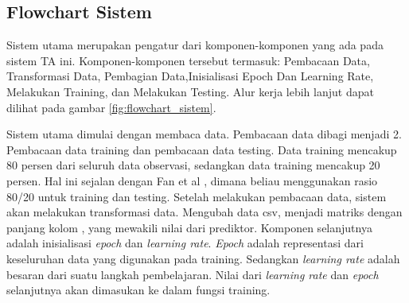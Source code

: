 

\subsection{Flowchart Sistem}

Sistem utama merupakan pengatur dari komponen-komponen yang ada pada sistem TA ini. Komponen-komponen tersebut termasuk: Pembacaan Data, Transformasi Data, Pembagian Data,Inisialisasi Epoch Dan Learning Rate, Melakukan Training, dan Melakukan Testing. Alur kerja lebih lanjut dapat dilihat pada gambar \ref{fig:flowchart_sistem}.

Sistem utama dimulai dengan membaca data. Pembacaan data dibagi menjadi 2. Pembacaan data training dan pembacaan data testing. Data training mencakup 80 persen dari seluruh data observasi, sedangkan data training mencakup 20 persen. Hal ini sejalan dengan Fan et al \cite{fan2008liblinear}, dimana beliau menggunakan rasio 80/20 untuk training dan testing. Setelah melakukan pembacaan data, sistem akan melakukan transformasi data. Mengubah data csv, menjadi matriks dengan panjang kolom , yang mewakili nilai dari prediktor. Komponen selanjutnya adalah inisialisasi \emph{epoch} dan \emph{learning rate}. \emph{Epoch} adalah representasi dari keseluruhan data yang digunakan pada training. Sedangkan \emph{learning rate} adalah besaran dari suatu langkah pembelajaran. Nilai dari \emph{learning rate} dan \emph{epoch} selanjutnya akan dimasukan ke dalam fungsi training.

